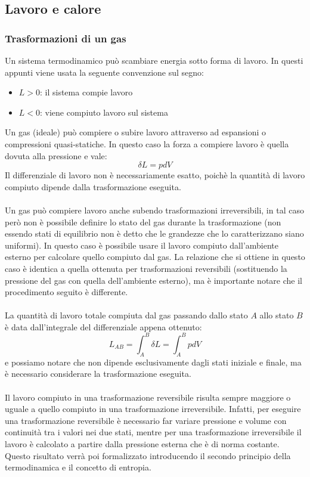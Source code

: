 \documentclass{article}
\begin{document}
\subsection{Lavoro e calore}

\subsubsection{Trasformazioni di un gas}
Un sistema termodinamico può scambiare energia sotto forma di lavoro. In questi appunti viene usata la seguente convenzione sul segno:
\begin{itemize}
    \item $L>0$: il sistema compie lavoro
    \item $L<0$: viene compiuto lavoro sul sistema
\end{itemize}
Un gas (ideale) può compiere o subire lavoro attraverso ad espansioni o compressioni quasi-statiche. In questo caso la forza a compiere lavoro è quella dovuta alla pressione e vale:
$$ \delta L=pdV $$
Il differenziale di lavoro non è necessariamente esatto, poichè la quantità di lavoro compiuto dipende dalla trasformazione eseguita.\\\\
Un gas può compiere lavoro anche subendo trasformazioni irreversibili, in tal caso però non è possibile definire lo stato del gas durante la trasformazione (non essendo stati di equilibrio non è detto che le grandezze che lo caratterizzano siano uniformi). In questo caso è possibile usare il lavoro compiuto dall'ambiente esterno per calcolare quello compiuto dal gas. La relazione che si ottiene in questo caso è identica a quella ottenuta per trasformazioni reversibili (sostituendo la pressione del gas con quella dell'ambiente esterno), ma è importante notare che il procedimento seguito è differente.\\\\
La quantità di lavoro totale compiuta dal gas passando dallo stato $A$ allo stato $B$ è data dall'integrale del differenziale appena ottenuto:
$$ L_{AB} = \int_{A}^{B}\delta L=\int_{A}^{B}pdV$$
e possiamo notare che non dipende esclusivamente dagli stati iniziale e finale, ma è necessario considerare la trasformazione eseguita.\\\\
Il lavoro compiuto in una trasformazione reversibile risulta sempre maggiore o uguale a quello compiuto in una trasformazione irreversibile. Infatti, per eseguire una trasformazione reversibile è necessario far variare pressione e volume con continuità tra i valori nei due stati, mentre per una trasformazione irreversibile il lavoro è calcolato a partire dalla pressione esterna che è di norma costante. Questo risultato verrà poi formalizzato introducendo il secondo principio della termodinamica e il concetto di entropia.
\end{document}

